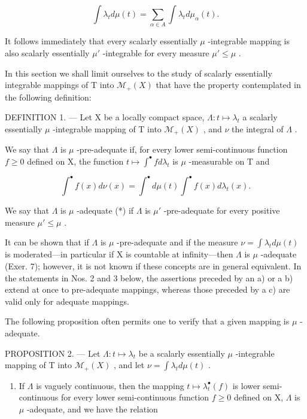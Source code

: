 \[
\int \lambda_ {t} d \mu (t) = \sum_ {\alpha \in A} \int \lambda_ {t} d \mu_ {\alpha} (t).\tag{3}
\]

It follows immediately that every scalarly essentially \(\mu\) -integrable mapping is also scalarly essentially \(\mu'\) -integrable for every measure \(\mu' \leqslant \mu\) .

In this section we shall limit ourselves to the study of scalarly essentially integrable mappings of T into \(\mathcal{M}_{+}(X)\) that have the property contemplated in the following definition:

DEFINITION 1. --- Let X be a locally compact space, \(\Lambda : t \mapsto \lambda_t\) a scalarly essentially \(\mu\) -integrable mapping of T into \(\mathcal{M}_{+}(X)\) , and \(\nu\) the integral of \(\Lambda\) .

We say that \(\Lambda\) is \(\mu\) -pre-adequate if, for every lower semi-continuous function \(f \geqslant 0\) defined on X, the function \(t \mapsto \int^{\bullet} f d\lambda_t\) is \(\mu\) -measurable on T and

\[
\int^ {\bullet} f (x) d \nu (x) = \int^ {\bullet} d \mu (t) \int^ {\bullet} f (x) d \lambda_ {t} (x).\tag{4}
\]

We say that \(\Lambda\) is \(\mu\) -adequate (*) if \(\Lambda\) is \(\mu'\) -pre-adequate for every positive measure \(\mu' \leqslant \mu\) .

It can be shown that if \(\Lambda\) is \(\mu\) -pre-adequate and if the measure \(\nu = \int \lambda_{t} d\mu(t)\) is moderated---in particular if X is countable at infinity---then \(\Lambda\) is \(\mu\) -adequate (Exer. 7); however, it is not known if these concepts are in general equivalent. In the statements in Nos. 2 and 3 below, the assertions preceded by an a) or a b) extend at once to pre-adequate mappings, whereas those preceded by a c) are valid only for adequate mappings.

The following proposition often permits one to verify that a given mapping is \(\mu\) -adequate.

PROPOSITION 2. --- Let \(\Lambda : t \mapsto \lambda_t\) be a scalarly essentially \(\mu\) -integrable mapping of T into \(\mathcal{M}_{+}(X)\) , and let \(\nu = \int \lambda_t d\mu(t)\) .

\begin{enumerate}
\def\labelenumi{\alph{enumi})}
\tightlist
\item
  If \(\Lambda\) is vaguely continuous, then the mapping \(t \mapsto \lambda_t^\bullet(f)\) is lower semi-continuous for every lower semi-continuous function \(f \geqslant 0\) defined on X, \(\Lambda\) is \(\mu\) -adequate, and we have the relation
\end{enumerate}

